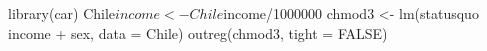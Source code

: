 \begin{Schunk}
\begin{Sinput}
 library(car)
 Chile$income <- Chile$income/1000000
 chmod3 <- lm(statusquo ~ income + sex, data = Chile)
 outreg(chmod3, tight = FALSE)
\end{Sinput}
\end{Schunk}
